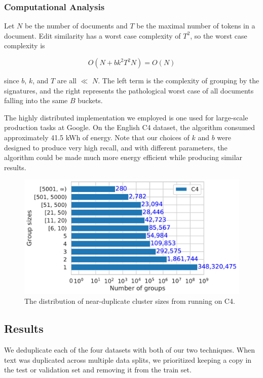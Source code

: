 \subsubsection{Computational Analysis}

Let $N$ be the number of documents and $T$ be the maximal number of tokens in a document. Edit similarity has a worst case complexity of $T^2$, so the worst case complexity is

\begin{equation}
    O(N + b k^{2} T^{2} N) = O(N)
\end{equation}

\noindent since $b$, $k$, and $T$ are all $\ll$ $N$. The left term is the complexity of grouping by the signatures, and the right represents the pathological worst case of all documents falling into the same $B$ buckets.

The highly distributed \Approx{} implementation we employed is one used for large-scale production tasks at Google.
On the English C4 dataset, the algorithm consumed approximately 41.5 kWh of energy.
Note that our choices of $k$ and $b$ were designed to produce very high recall, and with different parameters, the algorithm could be made much more energy efficient while producing similar results.


\begin{figure}[t]
    \centering
    \includegraphics[width=0.6\linewidth]{figures/nd3/nd3-cluster-hist-c4.pdf}
    \caption{The distribution of near-duplicate cluster sizes from running \Approx{} on C4.}
    \label{fig:nd3-cluster-hist-c4}
\end{figure}

\subsection{Results}\label{sec:deduplication-results}
We deduplicate each of the four datasets with both of our two techniques.
When text was duplicated across multiple data splits, we prioritized keeping a copy in the test or validation set and removing it from the train set.
%

